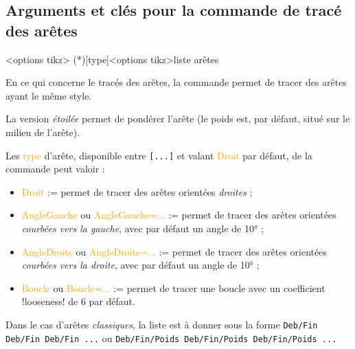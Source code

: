 \documentclass[french,a4paper,11pt]{article}
\newcommand\Cle[1]{{\small\sffamily\textlangle \textcolor{orange}{#1}\textrangle}}
\begin{document}
{{\begin{DemoCode}[]
\begin{GrapheTikz}[TypeSommets=diamond,DimensionSommets=2cm/1.5cm]
\end{GrapheTikz}
\end{DemoCode}

\pagebreak

\subsection{Arguments et clés pour la commande de tracé des arêtes}

\begin{DemoCode}
\begin{GrapheTikz}[clés]<options tikz>
	\GrphTraceAretes(*)[type]<options tikz>{liste arêtes}
\end{GrapheTikz}
\end{DemoCode}

\begin{tipblock}
En ce qui concerne le tracés des arêtes, la commande permet de tracer des arêtes ayant le même style.

\smallskip

La version \textit{étoilée} permet de pondérer l'arête (le poids est, par défaut, situé sur le milieu de l'arête).

\smallskip

Les \Cle{type} d'arête, disponible entre \texttt{[...]} et valant \Cle{Droit} par défaut, de la commande peut valoir :

\begin{itemize}
	\item \Cle{Droit} := permet de tracer des arêtes orientées \textit{droites} ;
	\item \Cle{AngleGauche} ou \Cle{AngleGauche=...} := permet de tracer des arêtes orientées \textit{courbées vers la gauche}, avec par défaut un angle de 10° ;
	\item \Cle{AngleDroite} ou \Cle{AngleDroite=...} := permet de tracer des arêtes orientées \textit{courbées vers la droite}, avec par défaut un angle de 10° ;
	\item \Cle{Boucle} ou \Cle{Boucle=...} := permet de tracer une boucle avec un coefficient \motcletex!looseness! de 6 par défaut.
\end{itemize}

Dans le cas d'arêtes \textit{classiques}, la liste est à donner sous la forme \verb|Deb/Fin Deb/Fin Deb/Fin ...| ou \verb|Deb/Fin/Poids Deb/Fin/Poids Deb/Fin/Poids ...|


\end{tipblock}}}
\end{document}
